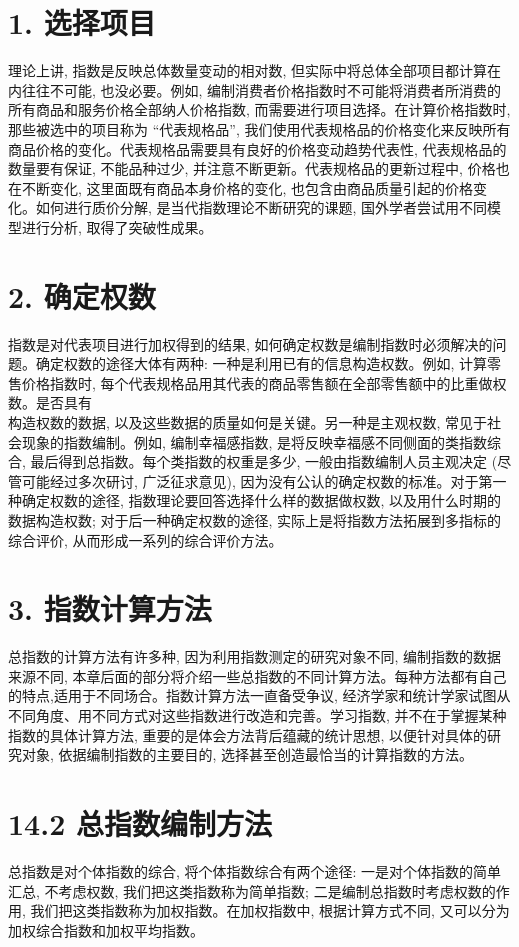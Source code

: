 \documentclass[10pt]{article}
\begin{document}
\begin{CJK*}{UTF8}{bsmi}
\section*{1. 选择项目}
理论上讲, 指数是反映总体数量变动的相对数, 但实际中将总体全部项目都计算在内往往不可能, 也没必要。例如, 编制消费者价格指数时不可能将消费者所消费的所有商品和服务价格全部纳人价格指数, 而需要进行项目选择。在计算价格指数时, 那些被选中的项目称为 “代表规格品”, 我们使用代表规格品的价格变化来反映所有商品价格的变化。代表规格品需要具有良好的价格变动趋势代表性, 代表规格品的数量要有保证, 不能品种过少, 并注意不断更新。代表规格品的更新过程中, 价格也在不断变化, 这里面既有商品本身价格的变化, 也包含由商品质量引起的价格变化。如何进行质价分解, 是当代指数理论不断研究的课题, 国外学者尝试用不同模型进行分析, 取得了突破性成果。

\section*{2. 确定权数}
指数是对代表项目进行加权得到的结果, 如何确定权数是编制指数时必须解决的问题。确定权数的途径大体有两种: 一种是利用已有的信息构造权数。例如, 计算零售价格指数时, 每个代表规格品用其代表的商品零售额在全部零售额中的比重做权数。是否具有\\
构造权数的数据, 以及这些数据的质量如何是关键。另一种是主观权数, 常见于社会现象的指数编制。例如, 编制幸福感指数, 是将反映幸福感不同侧面的类指数综合, 最后得到总指数。每个类指数的权重是多少, 一般由指数编制人员主观决定 (尽管可能经过多次研讨, 广泛征求意见), 因为没有公认的确定权数的标准。对于第一种确定权数的途径, 指数理论要回答选择什么样的数据做权数, 以及用什么时期的数据构造权数; 对于后一种确定权数的途径, 实际上是将指数方法拓展到多指标的综合评价, 从而形成一系列的综合评价方法。

\section*{3. 指数计算方法}
总指数的计算方法有许多种, 因为利用指数测定的研究对象不同, 编制指数的数据来源不同, 本章后面的部分将介绍一些总指数的不同计算方法。每种方法都有自己的特点,适用于不同场合。指数计算方法一直备受争议, 经济学家和统计学家试图从不同角度、用不同方式对这些指数进行改造和完善。学习指数, 并不在于掌握某种指数的具体计算方法, 重要的是体会方法背后蕴藏的统计思想, 以便针对具体的研究对象, 依据编制指数的主要目的, 选择甚至创造最恰当的计算指数的方法。

\section*{14.2 总指数编制方法}
总指数是对个体指数的综合, 将个体指数综合有两个途径: 一是对个体指数的简单汇总, 不考虑权数, 我们把这类指数称为简单指数; 二是编制总指数时考虑权数的作用, 我们把这类指数称为加权指数。在加权指数中, 根据计算方式不同, 又可以分为加权综合指数和加权平均指数。


\end{CJK*}
\end{document}

